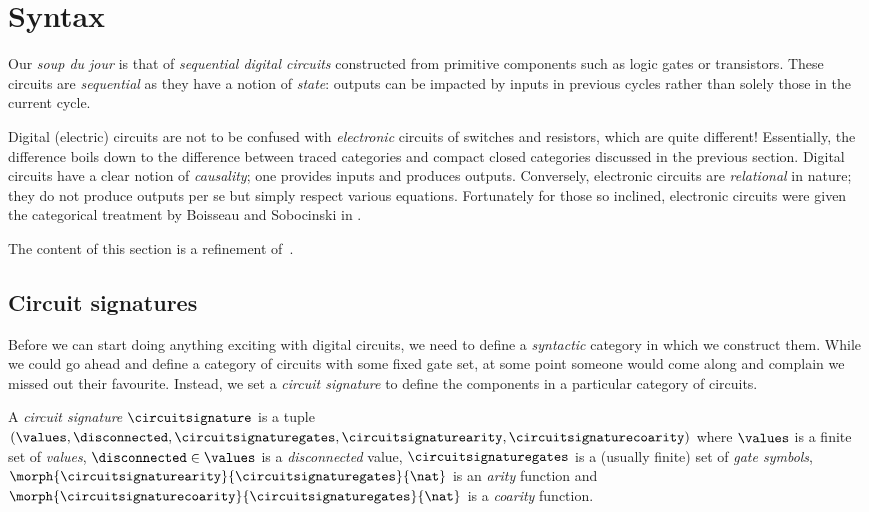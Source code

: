 \chapter{Syntax}

Our \emph{soup du jour} is that of \emph{sequential digital circuits}
constructed from primitive components such as logic gates or transistors.
These circuits are \emph{sequential} as they have a notion of \emph{state}:
outputs can be impacted by inputs in previous cycles rather than solely those in
the current cycle.

\begin{remark}
    Digital (electric) circuits are not to be confused with \emph{electronic}
    circuits of switches and resistors, which are quite different!
    Essentially, the difference boils down to the difference between traced
    categories and compact closed categories discussed in the previous section.
    Digital circuits have a clear notion of \emph{causality}; one provides
    inputs and produces outputs.
    Conversely, electronic circuits are \emph{relational} in nature; they do not
    produce outputs per se but simply respect various equations.
    Fortunately for those so inclined, electronic circuits were given the
    categorical treatment by Boisseau and Sobocinski in
    \cite{boisseau2022string}.
\end{remark}

\begin{remark}
    The content of this section is a refinement of~\cite[Section 2]{ghica2024fully}.
\end{remark}

\section{Circuit signatures}

Before we can start doing anything exciting with digital circuits, we need to
define a \emph{syntactic} category in which we construct them.
While we could go ahead and define a category of circuits with some fixed gate
set, at some point someone would come along and complain we missed out their
favourite.
Instead, we set a \emph{circuit signature} to define the components in a
particular category of circuits.

\begin{definition}
    A \emph{circuit signature} \(\circuitsignature\) is a tuple \((
    \values,
    \disconnected,
    \circuitsignaturegates,
    \circuitsignaturearity,
    \circuitsignaturecoarity
    )\) where \(\values\) is a finite set of \emph{values}, \(
    \disconnected \in \values
    \) is a \emph{disconnected} value, \(\circuitsignaturegates\) is a (usually
    finite) set of \emph{gate symbols}, \(
    \morph{\circuitsignaturearity}{\circuitsignaturegates}{\nat}
    \) is an \emph{arity} function and \(
    \morph{\circuitsignaturecoarity}{\circuitsignaturegates}{\nat}
    \) is a \emph{coarity} function.
\end{definition}

